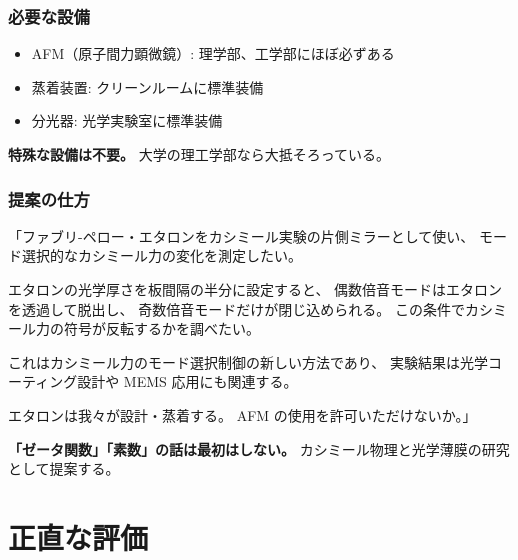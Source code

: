 \documentclass[12pt,a4paper]{article}
\begin{document}
\section{必要な設備}

\begin{itemize}
\item AFM（原子間力顕微鏡）: 理学部、工学部にほぼ必ずある
\item 蒸着装置: クリーンルームに標準装備
\item 分光器: 光学実験室に標準装備
\end{itemize}

\textbf{特殊な設備は不要。} 大学の理工学部なら大抵そろっている。

\section{提案の仕方}

\begin{expbox}[提案テンプレート]
「ファブリ-ペロー・エタロンをカシミール実験の片側ミラーとして使い、
モード選択的なカシミール力の変化を測定したい。

エタロンの光学厚さを板間隔の半分に設定すると、
偶数倍音モードはエタロンを透過して脱出し、
奇数倍音モードだけが閉じ込められる。
この条件でカシミール力の符号が反転するかを調べたい。

これはカシミール力のモード選択制御の新しい方法であり、
実験結果は光学コーティング設計や MEMS 応用にも関連する。

エタロンは我々が設計・蒸着する。
AFM の使用を許可いただけないか。」

\textbf{「ゼータ関数」「素数」の話は最初はしない。}
カシミール物理と光学薄膜の研究として提案する。
\end{expbox}

\part{正直な評価}
\end{document}
